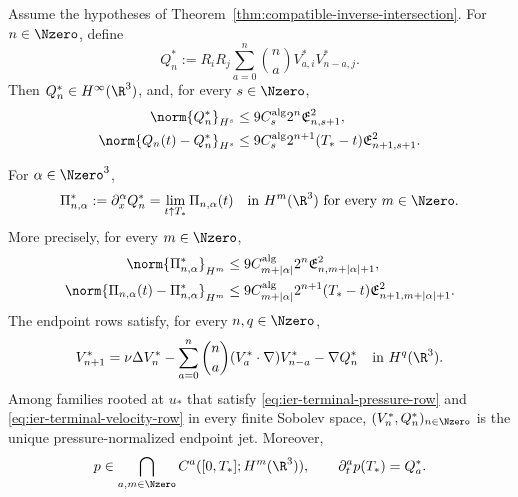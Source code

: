 \begin{theorem}
\label{thm:ier-pressure-complete-endpoint}
\begin{samepage}
Assume the hypotheses of
Theorem~\ref{thm:compatible-inverse-intersection}.
For \(n\in\Nzero\), define
\begin{equation}
 Q_n^*:=R_iR_j\sum_{a=0}^{n}\binom na
 V_{a,i}^*V_{n-a,j}^*.
 \label{eq:ier-terminal-pressure-row}
\end{equation}
Then \(Q_n^*\in H^\infty(\R^3)\), and, for every \(s\in\Nzero\),
\begin{align}
 \norm{Q_n^*}_{H^s}
 &\le9C_s^{\rm alg}2^n\mathfrak E_{n,s+1}^2,
 \label{eq:ier-terminal-pressure-size}\\
 \norm{Q_n(t)-Q_n^*}_{H^s}
 &\le9C_s^{\rm alg}2^{n+1}(T_*-t)\mathfrak E_{n+1,s+1}^2.
 \label{eq:ier-terminal-pressure-modulus}
\end{align}
\end{samepage}
For \(\alpha\in\Nzero^3\),
\begin{equation}
 \Pi_{n,\alpha}^*:=\partial_x^\alpha Q_n^*
 =\lim_{t\uparrow T_*}\Pi_{n,\alpha}(t)
 \quad\text{in }H^m(\R^3)\text{ for every }m\in\Nzero.
 \label{eq:ier-terminal-mixed-pressure-row}
\end{equation}
More precisely, for every \(m\in\Nzero\),
\begin{align}
 \norm{\Pi_{n,\alpha}^*}_{H^m}
 &\le9C_{m+|\alpha|}^{\rm alg}2^n
 \mathfrak E_{n,m+|\alpha|+1}^2,
 \label{eq:ier-terminal-mixed-pressure-size}\\
 \norm{\Pi_{n,\alpha}(t)-\Pi_{n,\alpha}^*}_{H^m}
 &\le9C_{m+|\alpha|}^{\rm alg}2^{n+1}(T_*-t)
 \mathfrak E_{n+1,m+|\alpha|+1}^2.
 \label{eq:ier-terminal-mixed-pressure-modulus}
\end{align}
The endpoint rows satisfy, for every \(n,q\in\Nzero\),
\begin{equation}
 V_{n+1}^*
 =\nu\Delta V_n^*
 -\sum_{a=0}^{n}\binom na(V_a^*\cdot\nabla)V_{n-a}^*
 -\nabla Q_n^*
 \quad\text{in }H^q(\R^3).
 \label{eq:ier-terminal-velocity-row}
\end{equation}
Among families rooted at \(u_*\) that satisfy
\eqref{eq:ier-terminal-pressure-row} and
\eqref{eq:ier-terminal-velocity-row} in every finite Sobolev space,
\((V_n^*,Q_n^*)_{n\in\Nzero}\) is the unique pressure-normalized endpoint
jet.  Moreover,
\begin{equation}
 p\in\bigcap_{a,m\in\Nzero}C^a([0,T_*];H^m(\R^3)),
 \qquad
 \partial_t^ap(T_*)=Q_a^*.
 \label{eq:ier-complete-left-pressure-jet}
\end{equation}
\end{theorem}

